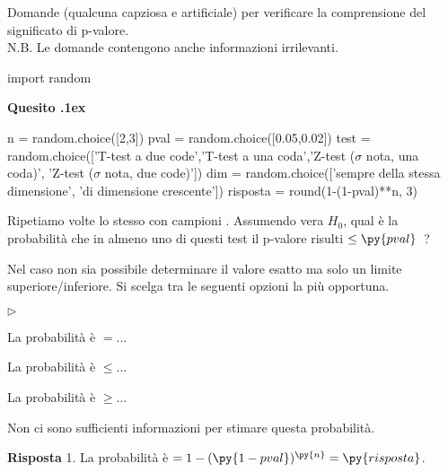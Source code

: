 \documentclass[11pt,twoside,a4paper]{article}
\newcommand{\mylabel}[1]{#1\hfill}
\renewenvironment{itemize}
  {\begin{list}{$\triangleright$}{%
   \setlength{\parskip}{0mm}
   \setlength{\topsep}{.4\baselineskip}
   \setlength{\rightmargin}{0mm}
   \setlength{\listparindent}{0mm}
   \setlength{\itemindent}{0mm}
   \setlength{\labelwidth}{2ex}
   \setlength{\itemsep}{.4\baselineskip}
   \setlength{\parsep}{0mm}
   \setlength{\partopsep}{0mm}
   \setlength{\labelsep}{1ex}
   \setlength{\leftmargin}{\labelwidth+\labelsep}
   \let\makelabel\mylabel}}{%
   \end{list}\vspace*{-1.3mm}}
\newcounter{quesito}
\newenvironment{question}{\bigskip\addtocounter{quesito}{1}\par\textbf{Quesito \thequesito.\kern1ex}}{\vspace{\parskip}}
\newenvironment{answer}{\par\textbf{Risposta\quad}}{\vspace{\parskip}}
\begin{document}
Domande (qualcuna capziosa e artificiale) per verificare la comprensione del significato di p-valore.\\
N.B. Le domande contengono anche informazioni irrilevanti.\bigskip

\begin{pycode}
import random
\end{pycode}

\begin{question}
\begin{pycode}
n = random.choice([2,3])
pval = random.choice([0.05,0.02])
test = random.choice(['T-test a due code','T-test a una coda','Z-test ($\sigma$ nota, una coda)', 'Z-test ($\sigma$ nota, due code)'])
dim  = random.choice(['sempre della stessa dimensione', 'di dimensione crescente'])
risposta = round(1-(1-pval)**n, 3)
\end{pycode}
Ripetiamo  volte lo stesso  con campioni .
Assumendo vera $H_0$, qual è la probabilità che in almeno uno di questi test il p-valore risulti $\le\py{pval}$~? 

Nel caso non sia possibile determinare il valore esatto ma solo un limite superiore/inferiore. Si scelga tra le seguenti opzioni la più opportuna.
\begin{itemize}
\item[1.] La probabilità è $=\dots$
\item[2.] La probabilità è $\le\dots$
\item[3.] La probabilità è $\ge\dots$
\item[4.] Non ci sono sufficienti informazioni per stimare questa probabilità.
\end{itemize}
\begin{answer}
{\color{blue}1. La probabilità è $=1-(\py{1-pval})^{\py{n}}=\py{risposta}$.}
\end{answer}
\end{question}
\end{document}
